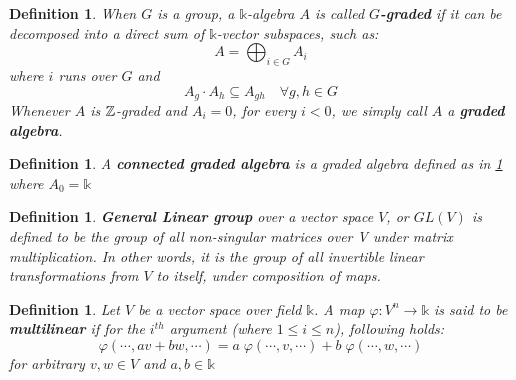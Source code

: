 \documentclass[12pt]{article}
\newtheorem{definition}[theorem]{Definition}
\numberwithin{theorem}{section}
\numberwithin{equation}{theorem}
\newcommand{\kk}{\mathds{k}}
\begin{document}
\begin{definition}\label{grading}
    When $G$ is a group,  a $\kk$-algebra $A$ is called \textbf{ $G$-graded} if it can be decomposed into a direct sum of $\kk$-vector subspaces, such as:
    $$A = \bigoplus_{i \in G} A_i$$
    where $i$ runs over $G$ and  %
    $$A_g \cdot A_h \subseteq A_{gh} \quad \forall g, h \in G $$
    Whenever $A$ is $ \Bbb{Z}$-graded and $ A_i = 0$, for every $ i < 0$, we simply call $A$  a  \textbf{graded algebra}.  
\end{definition}
\begin{definition}
    A \textbf{connected graded algebra} is a graded algebra defined as in \ref{grading} where $A_0 = \kk$
\end{definition}
\begin{definition}
    \textbf{General Linear group} over a vector space $V$, or \textbf{$GL(V)$} is defined to be the group of all non-singular matrices over V under matrix multiplication. In other words, it is the group of all invertible linear transformations from $V$ to itself, under composition of maps.
\end{definition}
\begin{definition}
    Let $V$ be a vector space over field $\kk$. A map $\varphi : V^n \to \kk$ is said to be \textbf{multilinear} if for the $i^{th}$ argument (where $1 \le i \le n$), following holds: 
    $$
        \varphi(\cdots, av + bw, \cdots) = a\;\varphi(\cdots, v, \cdots) + b\;\varphi(\cdots, w, \cdots)
    $$
    for arbitrary $v, w \in V$ and $a, b \in \kk$
\end{definition}
\end{document}
